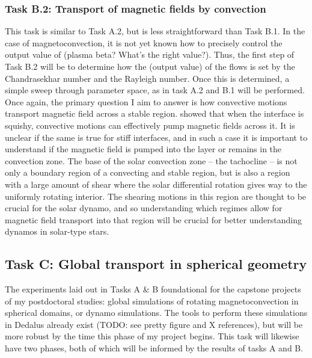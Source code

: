 \documentclass[aasms,12pt]{article}
\begin{document}
\subsubsection{Task B.2: Transport of magnetic fields by convection}
This task is similar to Task A.2, but is less straightforward than Task B.1.
In the case of magnetoconvection, it is not yet known how to precisely control the output value of (plasma beta? What's the right value?).
Thus, the first step of Task B.2 will be to determine how the (output value) of the flows is set by the Chandrasekhar number and the Rayleigh number.
Once this is determined, a simple sweep through parameter space, as in task A.2 and B.1 will be performed.
Once again, the primary question I aim to answer is how convective motions transport magnetic field across a stable region.
\citet{tobias&all1998} showed that when the interface is squishy, convective motions can effectively pump magnetic fields across it.
It is unclear if the same is true for stiff interfaces, and in such a case it is important to understand if the magnetic field is pumped into the layer or remains in the convection zone.
The base of the solar convection zone -- the tachocline -- is not only a boundary region of a convecting and stable region, but is also a region with a large amount of shear where the solar differential rotation gives way to the uniformly rotating interior.
The shearing motions in this region are thought to be crucial for the solar dynamo, and so understanding which regimes allow for magnetic field transport into that region will be crucial for better understanding dynamos in solar-type stars.


\subsection{Task C: Global transport in spherical geometry}
\label{sct:global_models}
The experiments laid out in Tasks A \& B foundational for the capstone projects of my postdoctoral studies: global simulations of rotating magnetoconvection in spherical domains, or dynamo simulations.
The tools to perform these simulations in Dedalus already exist (TODO: see pretty figure and X references), but will be more robust by the time this phase of my project begins.
This task will likewise have two phases, both of which will be informed by the results of tasks A and B.
\end{document}
